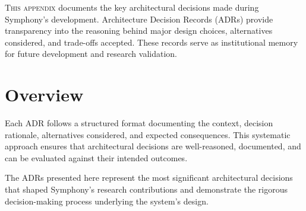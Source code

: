 \label{app:adrs}


\vspace{0.5cm}
\lettrine{T}{his appendix} documents the key architectural decisions made during Symphony's development. Architecture Decision Records (ADRs) provide transparency into the reasoning behind major design choices, alternatives considered, and trade-offs accepted. These records serve as institutional memory for future development and research validation.

\section*{Overview}

Each ADR follows a structured format documenting the context, decision rationale, alternatives considered, and expected consequences. This systematic approach ensures that architectural decisions are well-reasoned, documented, and can be evaluated against their intended outcomes.

The ADRs presented here represent the most significant architectural decisions that shaped Symphony's research contributions and demonstrate the rigorous decision-making process underlying the system's design.











